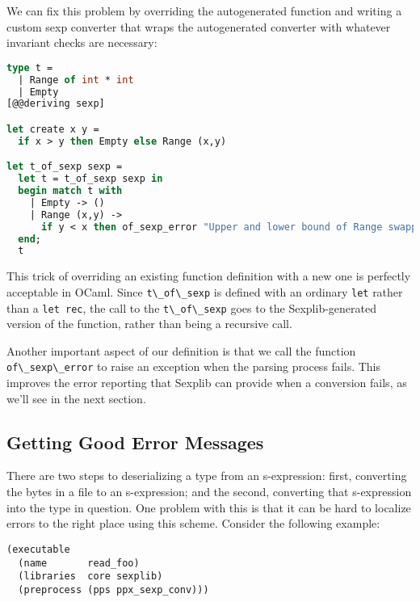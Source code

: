 We can fix this problem by overriding the autogenerated function and
writing a custom sexp converter that wraps the autogenerated converter
with whatever invariant checks are necessary:

\begin{lstlisting}[language=Caml]
type t =
  | Range of int * int
  | Empty
[@@deriving sexp]

let create x y =
  if x > y then Empty else Range (x,y)

let t_of_sexp sexp =
  let t = t_of_sexp sexp in
  begin match t with
    | Empty -> ()
    | Range (x,y) ->
      if y < x then of_sexp_error "Upper and lower bound of Range swapped" sexp
  end;
  t
\end{lstlisting}

This trick of overriding an existing function definition with a new one
is perfectly acceptable in OCaml. Since
\passthrough{\lstinline!t\_of\_sexp!} is defined with an ordinary
\passthrough{\lstinline!let!} rather than a
\passthrough{\lstinline!let rec!}, the call to the
\passthrough{\lstinline!t\_of\_sexp!} goes to the Sexplib-generated
version of the function, rather than being a recursive call.

Another important aspect of our definition is that we call the function
\passthrough{\lstinline!of\_sexp\_error!} to raise an exception when the
parsing process fails. This improves the error reporting that Sexplib
can provide when a conversion fails, as we'll see in the next section.

\hypertarget{getting-good-error-messages}{%
\subsection{Getting Good Error
Messages}\label{getting-good-error-messages}}

There are two steps to deserializing a type from an s-expression: first,
converting the bytes in a file to an s-expression; and the second,
converting that s-expression into the type in question. One problem with
this is that it can be hard to localize errors to the right place using
this scheme. Consider the following example:

\begin{lstlisting}
(executable
  (name       read_foo)
  (libraries  core sexplib)
  (preprocess (pps ppx_sexp_conv)))
\end{lstlisting}

